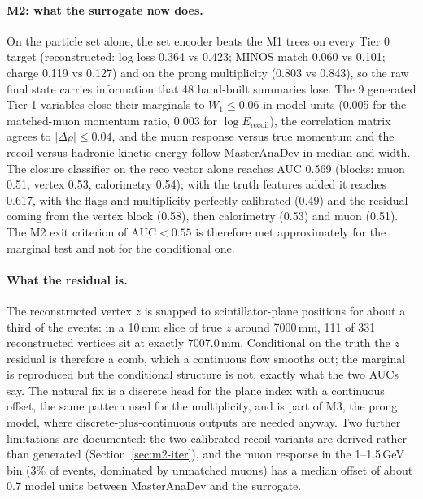 
\paragraph{M2: what the surrogate now does.} On the particle set alone, the set encoder beats the M1 trees on every
Tier 0 target (reconstructed: log loss 0.364 vs 0.423; MINOS match
0.060 vs 0.101; charge 0.119 vs 0.127)
and on the prong multiplicity (0.803 vs 0.843), so the raw
final state carries information that 48 hand-built summaries lose. The 9 generated Tier 1 variables close their
marginals to $W_1 \le 0.06$ in model units (0.005 for the matched-muon
momentum ratio, 0.003 for $\log E_\mathrm{recoil}$), the correlation matrix agrees to
$|\Delta\rho| \le 0.04$, and the muon response versus true momentum and the recoil versus hadronic
kinetic energy follow MasterAnaDev in median and width. The closure classifier on the reco vector alone reaches AUC
0.569 (blocks: muon 0.51, vertex 0.53, calorimetry 0.54); with the truth features added it
reaches 0.617, with the flags and multiplicity perfectly calibrated (0.49) and the residual
coming from the vertex block (0.58), then calorimetry (0.53) and muon (0.51). The M2 exit criterion of
$\mathrm{AUC} < 0.55$ is therefore met approximately for the marginal test and not for the conditional one.

\paragraph{What the residual is.} The reconstructed vertex $z$ is snapped to scintillator-plane positions for about
a third of the events: in a 10\,mm slice of true $z$ around 7000\,mm, 111 of 331 reconstructed vertices sit at
exactly 7007.0\,mm. Conditional on the truth the $z$ residual is therefore a comb, which a continuous flow smooths
out; the marginal is reproduced but the conditional structure is not, exactly what the two AUCs say. The natural
fix is a discrete head for the plane index with a continuous offset, the same pattern used for the multiplicity,
and is part of M3, the prong model, where discrete-plus-continuous outputs are needed anyway. Two further
limitations are documented: the two calibrated recoil variants are derived rather than generated
(Section~\ref{sec:m2-iter}), and the muon response in the 1--1.5\,GeV bin (3\% of events, dominated by unmatched
muons) has a median offset of about 0.7 model units between MasterAnaDev and the surrogate.

